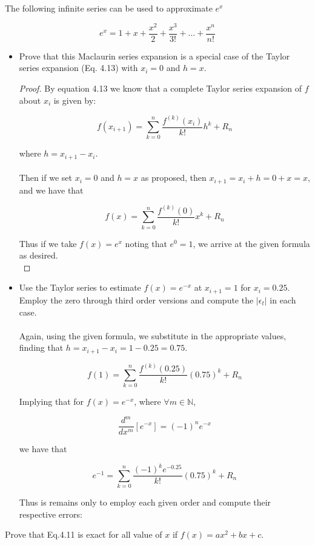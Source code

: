 \documentclass{article}
\begin{document}
\setcounter{problem}{9}
\begin{problem}

	The following infinite series can be used to approximate $e^{x}$

	\[ e^{x} = 1 + x + \frac{x^{2}}{2} + \frac{x^{3}}{3!} + \dots + \frac{x^{n}}{n!} \]
	
\end{problem}

\begin{itemize}

	\item Prove that this Maclaurin series expansion is a special case of the Taylor series expansion (Eq. 4.13) with $x_{i}=0$ and $h=x$.\\
	
	\begin{proof}
		
		By equation 4.13 we know that a complete Taylor series expansion of $f$ about $x_{i}$ is given by:
		
		\[ f(x_{i+1}) = \sum_{k=0}^{n} \frac{f^{(k)}(x_{i})}{k!} h^{k} + R_{n} \]
		
		where $h = x_{i+1} - x_{i}$.\\
		\\
		Then if we set $x_{i}=0$ and $h=x$ as proposed, then $x_{i+1} = x_{i} + h = 0 + x = x$, and we have that
		
		\[ f(x) = \sum_{k=0}^{n} \frac{f^{(k)}(0)}{k!} x^{k} + R_{n} \]
		
		Thus if we take $f(x)=e^{x}$ noting that $e^{0}=1$, we arrive at the given formula as desired.\\
		
	\end{proof}

	\item Use the Taylor series to estimate $f(x)=e^{-x}$ at $x_{i+1}=1$ for $x_{i}=0.25$. Employ the zero through third order versions and compute the $\left|\epsilon_{t}\right|$ in each case.\\
	\\
	Again, using the given formula, we substitute in the appropriate values, finding that $h = x_{i+1} - x_{i} = 1 - 0.25 = 0.75$.
	
	\[ f(1) = \sum_{k=0}^{n} \frac{f^{(k)}(0.25)}{k!} (0.75)^{k} + R_{n} \]
	
	Implying that for $f(x)=e^{-x}$, where $\forall m\in\mathbb{N}$,
	
	\[ \frac{d^{m}}{dx^{m}}\left[e^{-x}\right] = (-1)^{n}e^{-x} \]
	
	we have that
	
	\[ e^{-1} = \sum_{k=0}^{n} \frac{(-1)^{k}e^{-0.25}}{k!} (0.75)^{k} + R_{n} \]
	
	Thus is remains only to employ each given order and compute their respective errors:
		
\end{itemize}

\setcounter{problem}{13}
\begin{problem}

	Prove that Eq.4.11 is exact for all value of $x$ if $f(x)=ax^{2} + bx + c$.
	
\end{problem}
\end{document}
